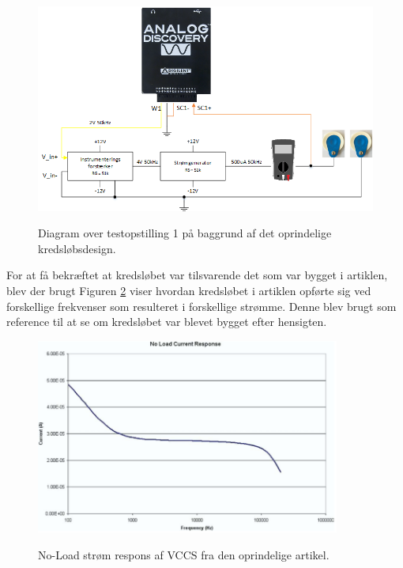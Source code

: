 \begin{figure}[H]
\centering
{\includegraphics[width=\linewidth]
{Figure/testopstilling1}}
\caption{Diagram over testopstilling 1 på baggrund af det oprindelige kredsløbsdesign.}
\label{fig:testopstilling1}
\end{figure}

For at få bekræftet at kredsløbet var tilsvarende det som var bygget i artiklen, blev der brugt 
Figuren \ref{fig:oprindeligeonload} viser hvordan kredsløbet i artiklen opførte sig ved forskellige frekvenser som resulteret i forskellige strømme. Denne  blev brugt som reference til at se om kredsløbet var blevet bygget efter hensigten. 

\begin{figure}[H]
\centering
{\includegraphics[width=10cm]
{Figure/oprindeligenoload}}
\caption{No-Load strøm respons af VCCS fra den oprindelige artikel\cite{Aroom2009}.}
\label{fig:oprindeligeonload}
\end{figure}

